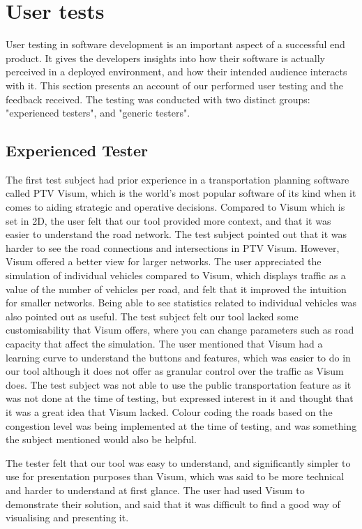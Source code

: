 \section{User tests}
    User testing in software development is an important aspect of a successful end product. It gives the developers insights into how their software is actually perceived in a deployed environment, and how their intended audience interacts with it. This section presents an account of our performed user testing and the feedback received. The testing was conducted with two distinct groups: "experienced testers", and "generic testers". 
    
    \subsection{Experienced Tester}
        The first test subject had prior experience in a transportation planning software called PTV Visum, which is the world's most popular software of its kind when it comes to aiding strategic and operative decisions\cite{visum}. Compared to Visum which is set in 2D, the user felt that our tool provided more context, and that it was easier to understand the road network. The test subject pointed out that it was harder to see the road connections and intersections in PTV Visum. However, Visum offered a better view for larger networks. The user appreciated the simulation of individual vehicles compared to Visum, which displays traffic as a value of the number of vehicles per road, and felt that it improved the intuition for smaller networks. Being able to see statistics related to individual vehicles was also pointed out as useful. The test subject felt our tool lacked some customisability that Visum offers, where you can change parameters such as road capacity that affect the simulation. The user mentioned that Visum had a learning curve to understand the buttons and features, which was easier to do in our tool although it does not offer as granular control over the traffic as Visum does. The test subject was not able to use the public transportation feature as it was not done at the time of testing, but expressed interest in it and thought that it was a great idea that Visum lacked. Colour coding the roads based on the congestion level was being implemented at the time of testing, and was something the subject mentioned would also be helpful.

        The tester felt that our tool was easy to understand, and significantly simpler to use for presentation purposes than Visum, which was said to be more technical and harder to understand at first glance. The user had used Visum to demonstrate their solution, and said that it was difficult to find a good way of visualising and presenting it. 


